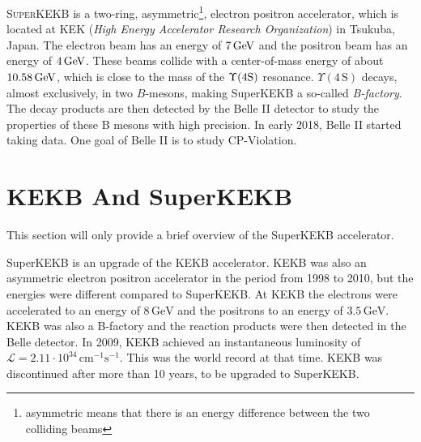 \documentclass[a4paper,11pt,twosided,final,german,openbib,pdftex,listof=totoc,bibliography=totoc]{scrbook}
\begin{document}
\lettrine{S}{uperKEKB} is a two-ring, asymmetric\footnote{asymmetric means that there is an energy difference between the two colliding beams}, electron positron accelerator, which is located at KEK (\textit{High Energy Accelerator Research Organization}) in Tsukuba, Japan. 
The electron beam has an energy of $7\,\textnormal{GeV}$ and the positron beam has an energy of $4\,\textnormal{GeV}$. These beams collide with a center-of-mass energy of about $10.58\,\textnormal{GeV}$, which is close to the mass of the $\Upsilon(4\textnormal{S})$ resonance. $\Upsilon(4\,\textrm{S})$ decays, almost exclusively, in two $B$-mesons, making SuperKEKB a so-called \textit{B-factory}. The decay products are then detected by the Belle II detector to study the properties of these B mesons with high precision. In early 2018, Belle II started taking data. One goal of Belle II is to study CP-Violation.\cite{B2B}

\section{KEKB And SuperKEKB}
\label{sec:KEK}


This section will only provide a brief overview of the SuperKEKB accelerator.

SuperKEKB is an upgrade of the KEKB accelerator. KEKB was also an asymmetric electron positron accelerator in the period from 1998 to 2010, but the energies were different compared to SuperKEKB. At KEKB the electrons were accelerated to an energy of $8\,\textrm{GeV}$ and the positrons to an energy of $3.5\,\textrm{GeV}$. KEKB was also a B-factory and the reaction products were then detected in the Belle detector. In 2009, KEKB achieved an instantaneous luminosity of $\mathcal{L} = 2.11 \cdot 10^{34}\,\textrm{cm}^{-1}\textrm{s}^{-1}$. This was the world record at that time. KEKB was discontinued after more than 10 years, to be upgraded to SuperKEKB.\cite{PTEP}
\end{document}
